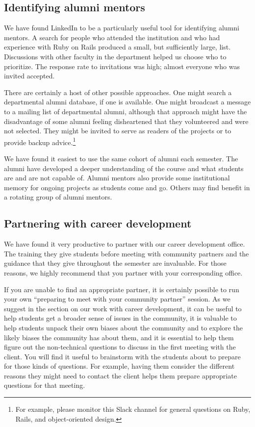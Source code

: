 \subsection{Identifying alumni mentors}

We have found LinkedIn to be a particularly useful tool for identifying
alumni mentors.  A search for people who attended the institution and
who had experience with Ruby on Rails produced a small, but sufficiently
large, list.  Discussions with other faculty in the department helped
us choose who to prioritize.  The response rate to invitations was high;
almost everyone who was invited accepted.

There are certainly a host of other possible approaches.  One might search
a departmental alumni database, if one is available.  One might broadcast
a message to a mailing list of departmental alumni, although that approach
might have the disadvantage of some alumni feeling disheartened that they
volunteered and were not selected.  They might be invited to serve as
readers of the projects or to provide backup advice.\footnote{For example,
please monitor this Slack channel for general questions on Ruby, Rails,
and object-oriented design.} %

We have found it easiest to use the same cohort of alumni each semester.
The alumni have developed a deeper understanding of the course and what
students are and are not capable of.  Alumni mentors also provide some 
institutional memory for ongoing projects as students come and go. 
Others may find benefit in a rotating group of alumni mentors.

\subsection{Partnering with career development}

We have found it very productive to partner with our career development
office.  The training they give students before meeting with community
partners and the guidance that they give throughout the semester
are invaluable.  For those reasons, we highly recommend that you
partner with your corresponding office.

If you are unable to find an appropriate partner, it is certainly
possible to run your own ``preparing to meet with your community
partner'' session.  As we suggest in the section on our work with
career development, it can be useful to help students get a broader
sense of issues in the community, it is valuable to help students
unpack their own biases about the community and to explore the
likely biases the community has about them, and it is essential to
help them figure out the non-technical questions to discuss in the
first meeting with the client.  You will find it useful to brainstorm
with the students about to prepare for those kinds of questions.
For example, having them consider the different reasons they might
need to contact the client helps them prepare appropriate questions
for that meeting.

